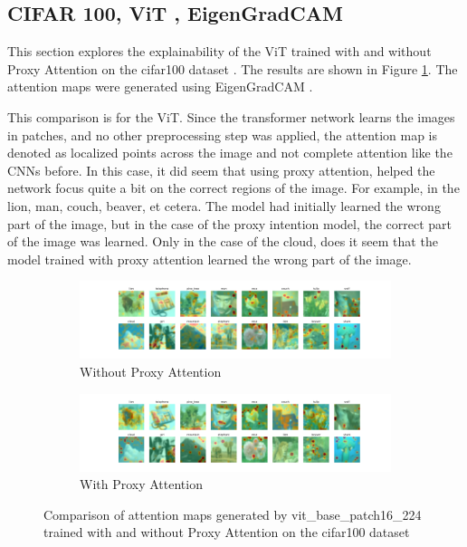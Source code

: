 \documentclass[a4paper,11pt,openright]{book}
\begin{document}
\subsection{CIFAR 100, ViT , EigenGradCAM}
This section explores the explainability of the ViT \cite{dosovitskiyImageWorth16x162021} trained with and without Proxy Attention on the cifar100 dataset \cite{krizhevskyLearningMultipleLayers}. The results are shown in Figure \ref{fig:vit_cifar100}. The attention maps were generated using EigenGradCAM \cite{banymuhammadEigenCAMVisualExplanations2021}.

This comparison is for the ViT. Since the transformer network learns the images in patches, and no other preprocessing step was applied, the attention map is denoted as localized points across the image and not complete attention like the CNNs before. In this case, it did seem that using proxy attention, helped the network focus quite a bit on the correct regions of the image. For example, in the lion, man, couch, beaver, et cetera. The model had initially learned the wrong part of the image, but in the case of the proxy intention model, the correct part of the image was learned. Only in the case of the cloud, does it seem that the model trained with proxy attention learned the wrong part of the image.

    \begin{figure}[!htb]
        \begin{subfigure}[b]{1\textwidth}
            \includegraphics[width=\linewidth]{images/gpp_cifar100_vit_base_patch16_224_noproxy_0.pdf}
            \caption{Without Proxy Attention}
        \end{subfigure}
        \begin{subfigure}[b]{1\textwidth}
            \includegraphics[width=\linewidth]{images/gpp_cifar100_vit_base_patch16_224_proxy_0.pdf}
            \caption{With Proxy Attention}
        \end{subfigure}
        \caption{Comparison of attention maps generated by vit\_base\_patch16\_224 trained with and without Proxy Attention on the cifar100 dataset}
        \label{fig:vit_cifar100}
    \end{figure}
    
\end{document}
